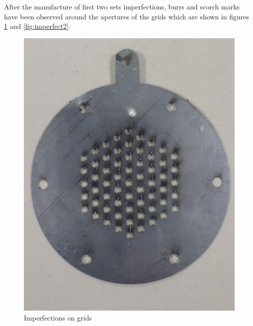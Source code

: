 After the manufacture of first two sets imperfections, burrs and scorch marks have been observed around the apertures of the grids which are shown in figures \ref{fig:imperfect1} and \ref{fig:imperfect2}. 

\begin{figure}[ht]
    \centering
    \includegraphics[scale=0.25]{fig/imperfect2.jpeg}
    \caption{Imperfections on grids}
    \label{fig:imperfect1}
\end{figure}

